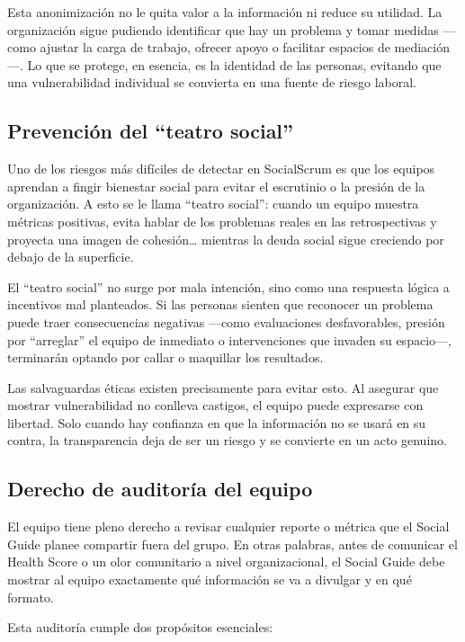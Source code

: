 Esta anonimización no le quita valor a la información ni reduce su utilidad. La organización sigue pudiendo identificar que hay un problema y tomar medidas —como ajustar la carga de trabajo, ofrecer apoyo o facilitar espacios de mediación—. Lo que se protege, en esencia, es la identidad de las personas, evitando que una vulnerabilidad individual se convierta en una fuente de riesgo laboral.

\subsection{Prevención del ``teatro social''}

Uno de los riesgos más difíciles de detectar en SocialScrum es que los equipos aprendan a fingir bienestar social para evitar el escrutinio o la presión de la organización. A esto se le llama ``teatro social'': cuando un equipo muestra métricas positivas, evita hablar de los problemas reales en las retrospectivas y proyecta una imagen de cohesión… mientras la deuda social sigue creciendo por debajo de la superficie.

El ``teatro social'' no surge por mala intención, sino como una respuesta lógica a incentivos mal planteados. Si las personas sienten que reconocer un problema puede traer consecuencias negativas —como evaluaciones desfavorables, presión por ``arreglar'' el equipo de inmediato o intervenciones que invaden su espacio—, terminarán optando por callar o maquillar los resultados.

Las salvaguardas éticas existen precisamente para evitar esto. Al asegurar que mostrar vulnerabilidad no conlleva castigos, el equipo puede expresarse con libertad. Solo cuando hay confianza en que la información no se usará en su contra, la transparencia deja de ser un riesgo y se convierte en un acto genuino.

\subsection{Derecho de auditoría del equipo}

El equipo tiene pleno derecho a revisar cualquier reporte o métrica que el Social Guide planee compartir fuera del grupo. En otras palabras, antes de comunicar el Health Score o un olor comunitario a nivel organizacional, el Social Guide debe mostrar al equipo exactamente qué información se va a divulgar y en qué formato.

Esta auditoría cumple dos propósitos esenciales:

